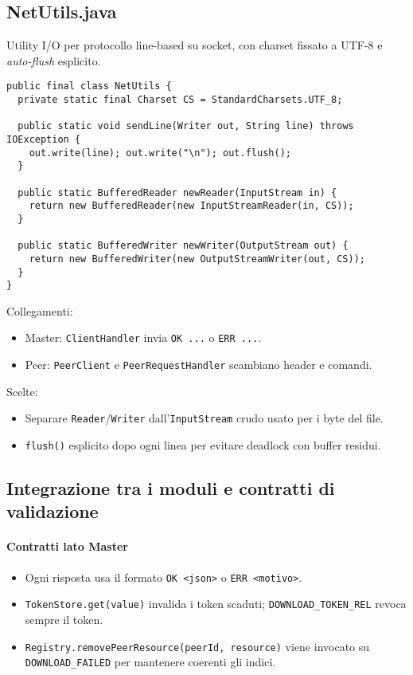 \documentclass[a4paper,12pt]{article}
\begin{document}
\subsection*{NetUtils.java}
Utility I/O per protocollo line-based su socket, con charset fissato a UTF-8 e \emph{auto-flush} esplicito.
\begin{lstlisting}
public final class NetUtils {
  private static final Charset CS = StandardCharsets.UTF_8;

  public static void sendLine(Writer out, String line) throws IOException {
    out.write(line); out.write("\n"); out.flush();
  }

  public static BufferedReader newReader(InputStream in) {
    return new BufferedReader(new InputStreamReader(in, CS));
  }

  public static BufferedWriter newWriter(OutputStream out) {
    return new BufferedWriter(new OutputStreamWriter(out, CS));
  }
}
\end{lstlisting}
Collegamenti:
\begin{itemize}[nosep]
  \item Master: \texttt{ClientHandler} invia \texttt{OK ...} o \texttt{ERR ...}.
  \item Peer: \texttt{PeerClient} e \texttt{PeerRequestHandler} scambiano header e comandi.
\end{itemize}
Scelte:
\begin{itemize}[nosep]
  \item Separare \texttt{Reader}/\texttt{Writer} dall’\texttt{InputStream} crudo usato per i byte del file.
  \item \texttt{flush()} esplicito dopo ogni linea per evitare deadlock con buffer residui.
\end{itemize}

\subsection*{Integrazione tra i moduli e contratti di validazione}

\paragraph{Contratti lato Master}
\begin{itemize}[nosep]
  \item Ogni risposta usa il formato \texttt{OK <json>} o \texttt{ERR <motivo>}.
  \item \texttt{TokenStore.get(value)} invalida i token scaduti; \texttt{DOWNLOAD\_TOKEN\_REL} revoca sempre il token.
  \item \texttt{Registry.removePeerResource(peerId, resource)} viene invocato su \texttt{DOWNLOAD\_FAILED} per mantenere coerenti gli indici.
\end{itemize}
\end{document}
